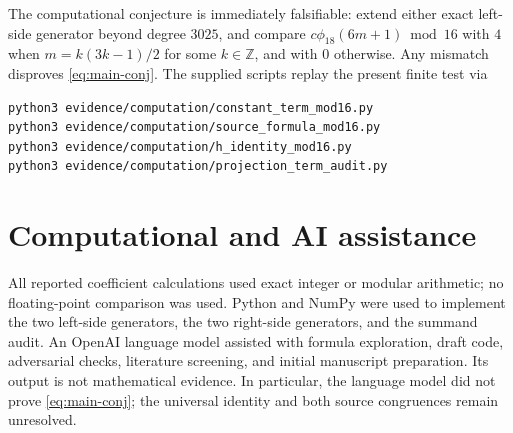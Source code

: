 \documentclass[11pt]{article}
\newcommand{\cphi}{c\phi}
\begin{document}
The computational conjecture is immediately falsifiable: extend either exact
left-side generator beyond degree $3025$, and compare
\(\cphi_{18}(6m+1)\bmod16\) with $4$ when $m=k(3k-1)/2$ for some
$k\in\mathbb Z$, and with $0$ otherwise.  Any mismatch disproves
\eqref{eq:main-conj}.  The supplied scripts replay the present finite test via
\begin{verbatim}
python3 evidence/computation/constant_term_mod16.py
python3 evidence/computation/source_formula_mod16.py
python3 evidence/computation/h_identity_mod16.py
python3 evidence/computation/projection_term_audit.py
\end{verbatim}

\section*{Computational and AI assistance}

All reported coefficient calculations used exact integer or modular
arithmetic; no floating-point comparison was used.  Python and NumPy were
used to implement the two left-side generators, the two right-side
generators, and the summand audit.  An OpenAI language model assisted with
formula exploration, draft code, adversarial checks, literature screening,
and initial manuscript preparation.  Its output is not mathematical
evidence.  In particular, the language model did not prove
\eqref{eq:main-conj}; the universal identity and both source congruences
remain unresolved.



\end{document}
